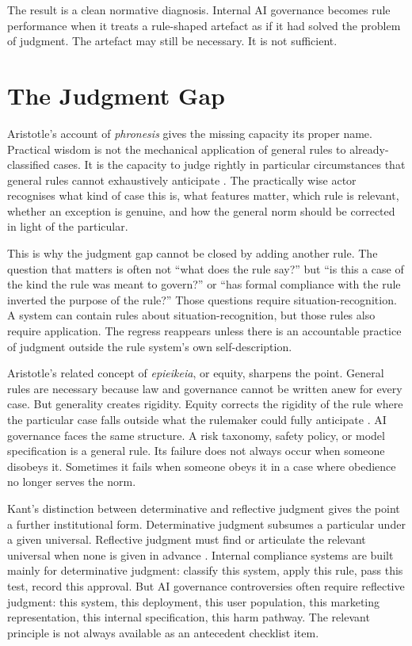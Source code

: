 \documentclass[11pt,a4paper]{article}
\begin{document}
The result is a clean normative diagnosis. Internal AI governance becomes rule performance when it treats a rule-shaped artefact as if it had solved the problem of judgment. The artefact may still be necessary. It is not sufficient.

\section{The Judgment Gap}

Aristotle's account of \emph{phronesis} gives the missing capacity its proper name. Practical wisdom is not the mechanical application of general rules to already-classified cases. It is the capacity to judge rightly in particular circumstances that general rules cannot exhaustively anticipate \citep[1142a]{aristotle_ne}. The practically wise actor recognises what kind of case this is, what features matter, which rule is relevant, whether an exception is genuine, and how the general norm should be corrected in light of the particular.

This is why the judgment gap cannot be closed by adding another rule. The question that matters is often not ``what does the rule say?'' but ``is this a case of the kind the rule was meant to govern?'' or ``has formal compliance with the rule inverted the purpose of the rule?'' Those questions require situation-recognition. A system can contain rules about situation-recognition, but those rules also require application. The regress reappears unless there is an accountable practice of judgment outside the rule system's own self-description.

Aristotle's related concept of \emph{epieikeia}, or equity, sharpens the point. General rules are necessary because law and governance cannot be written anew for every case. But generality creates rigidity. Equity corrects the rigidity of the rule where the particular case falls outside what the rulemaker could fully anticipate \citep[1137b]{aristotle_ne}. AI governance faces the same structure. A risk taxonomy, safety policy, or model specification is a general rule. Its failure does not always occur when someone disobeys it. Sometimes it fails when someone obeys it in a case where obedience no longer serves the norm.

Kant's distinction between determinative and reflective judgment gives the point a further institutional form. Determinative judgment subsumes a particular under a given universal. Reflective judgment must find or articulate the relevant universal when none is given in advance \citep[\S\S69--76]{kant1790judgment}. Internal compliance systems are built mainly for determinative judgment: classify this system, apply this rule, pass this test, record this approval. But AI governance controversies often require reflective judgment: this system, this deployment, this user population, this marketing representation, this internal specification, this harm pathway. The relevant principle is not always available as an antecedent checklist item.
\end{document}
